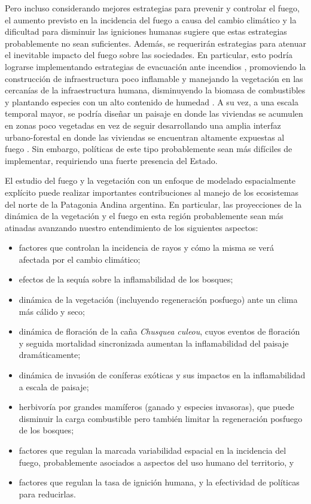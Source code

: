 Pero incluso considerando mejores estrategias para prevenir y controlar el fuego, el aumento previsto en la incidencia del fuego a causa del cambio climático y la dificultad para disminuir las igniciones humanas sugiere que estas estrategias probablemente no sean suficientes. Además, se requerirán estrategias para atenuar el inevitable impacto del fuego sobre las sociedades. En particular, esto podría lograrse implementando estrategias de evacuación ante incendios \citep{cova2002microsimulation}, promoviendo la construcción de infraestructura poco inflamable \citep{quarles2010home} y manejando la vegetación en las cercanías de la infraestructura humana, disminuyendo la biomasa de combustibles y plantando especies con un alto contenido de humedad \citep{reinhardt2008objectives, syphard2014role, blackhall_flammability_2019}. A su vez, a una escala temporal mayor, se podría diseñar un paisaje en donde las viviendas se acumulen en zonas poco vegetadas en vez de seguir desarrollando una amplia interfaz urbano-forestal en donde las viviendas se encuentran altamente expuestas al fuego \citep{syphard2013land, moritz2014learning, barrett2019reducing}. Sin embargo, políticas de este tipo probablemente sean más difíciles de implementar, requiriendo una fuerte presencia del Estado.   

El estudio del fuego y la vegetación con un enfoque de modelado espacialmente explícito puede realizar importantes contribuciones al manejo de los ecosistemas del norte de la Patagonia Andina argentina. En particular, las proyecciones de la dinámica de la vegetación y el fuego en esta región probablemente sean más atinadas avanzando nuestro entendimiento de los siguientes aspectos: 

\begin{itemize}
    \item factores que controlan la incidencia de rayos y cómo la misma se verá afectada por el cambio climático;
    \item efectos de la sequía sobre la inflamabilidad de los bosques;
    \item dinámica de la vegetación (incluyendo regeneración posfuego) ante un clima más cálido y seco;
    \item dinámica de floración de la caña \textit{Chusquea culeou}, cuyos eventos de floración y seguida mortalidad sincronizada aumentan la inflamabilidad del paisaje dramáticamente;
    \item dinámica de invasión de coníferas exóticas y sus impactos en la inflamabilidad a escala de paisaje;
    \item herbivoría por grandes mamíferos (ganado y especies invasoras), que puede disminuir la carga combustible pero también limitar la regeneración posfuego de los bosques;
    \item factores que regulan la marcada variabilidad espacial en la incidencia del fuego, probablemente asociados a aspectos del uso humano del territorio, y
    \item factores que regulan la tasa de ignición humana, y la efectividad de políticas para reducirlas.
\end{itemize}

